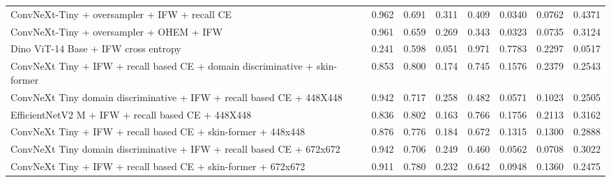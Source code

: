 \begin{table}[H]
{\begin{tabular}{|l|c|c|c|c|c|c|c|}
ConvNeXt-Tiny + oversampler + IFW + recall CE & 0.962 & 0.691 & 0.311 & 0.409 & 0.0340 & 0.0762 & 0.4371 \\
ConvNeXt-Tiny + oversampler + OHEM + IFW & 0.961 & 0.659 & 0.269 & 0.343 & 0.0323 & 0.0735 & 0.3124 \\
Dino ViT-14 Base + IFW cross entropy & 0.241 & 0.598 & 0.051 & 0.971 & 0.7783 & 0.2297 & 0.0517 \\
ConvNeXt Tiny + IFW + recall based CE + domain discriminative + skin-former  & 0.853 & 0.800 & 0.174 & 0.745 & 0.1576 & 0.2379 & 0.2543 \\
ConvNeXt Tiny domain discriminative + IFW + recall based CE + 448X448 & 0.942 & 0.717 & 0.258 & 0.482 & 0.0571 & 0.1023 & 0.2505 \\
EfficientNetV2 M + IFW + recall based CE + 448X448 & 0.836 & 0.802 & 0.163 & 0.766 & 0.1756 & 0.2113 & 0.3162 \\
ConvNeXt Tiny + IFW + recall based CE + skin-former + 448x448  & 0.876 & 0.776 & 0.184 & 0.672 & 0.1315 & 0.1300 & 0.2888 \\
ConvNeXt Tiny domain discriminative + IFW + recall based CE + 672x672 & 0.942 & 0.706 & 0.249 & 0.460 & 0.0562 & 0.0708 & 0.3022 \\
ConvNeXt Tiny + IFW + recall based CE + skin-former + 672x672 & 0.911 & 0.780 & 0.232 & 0.642 & 0.0948 & 0.1360 & 0.2475 \\
\bottomrule
\end{tabular}%
}
\end{table}


